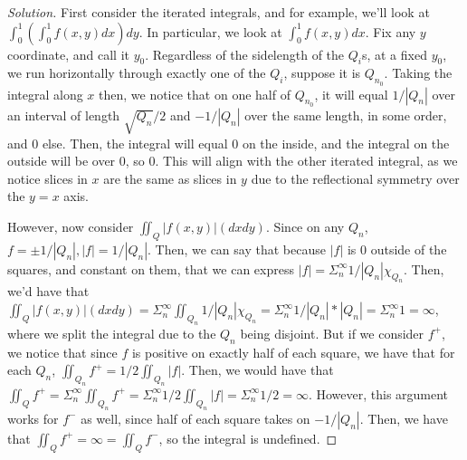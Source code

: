 \documentclass[10pt]{article}
\begin{document}
\begin{proof}[Solution]

First consider the iterated integrals, and for example, we'll look at $ \int_0^1 (\int_0^1 f(x,y)dx)dy$. In particular, we look at $\int_0^1 f(x,y)dx$. Fix any $y$ coordinate, and call it $y_0$. Regardless of the sidelength of the $Q_i$s, at a fixed $y_0$, we run horizontally through exactly one of the $Q_i$, suppose it is $Q_{n_0}$. Taking the integral along $x$ then, we notice that on one half of $Q_{n_0}$, it will equal $ 1/|Q_n|$ over an interval of length $\sqrt{Q_n}/2$ and $-1/|Q_n|$ over the same length, in some order, and 0 else. Then, the integral will equal 0 on the inside, and the integral on the outside will be over 0, so 0. This will align with the other iterated integral, as we notice slices in $x$ are the same as slices in $y$ due to the reflectional symmetry over the $y = x$ axis.

However, now consider $\iint_Q |f(x,y)| (dxdy)$. Since on any $Q_n$, $f = \pm 1/|Q_n|, |f| = 1/|Q_n|$. Then, we can say that because $|f|$ is 0 outside of the squares, and constant on them, that we can express $|f| = \Sigma_n^\infty 1/|Q_n| \chi_{Q_n}$. Then, we'd have that $\iint_Q |f(x,y)| (dxdy) = \Sigma_n^\infty \iint_{Q_n}  1/|Q_n| \chi_{Q_n} = \Sigma_n^\infty 1/|Q_n| \ast |Q_n| =  \Sigma_n^\infty 1 = \infty$, where we split the integral due to the $Q_n$ being disjoint. But if we consider $f^+$, we notice that since $f$ is positive on exactly half of each square, we have that for each $Q_n$, $\iint_{Q_n} f^+ = 1/2 \iint_{Q_n} |f|$. Then, we would have that $\iint_Q f^+ = \Sigma_n^\infty \iint_{Q_n} f^+ = \Sigma_n^\infty 1/2 \iint_{Q_n} |f| = \Sigma_n^\infty 1/2 = \infty$. However, this argument works for $f^-$ as well, since half of each square takes on $-1/|Q_n|$. Then, we have that $\iint_{Q} f^+ = \infty = \iint_{Q} f^-$, so the integral is undefined.

\end{proof}
\end{document}
